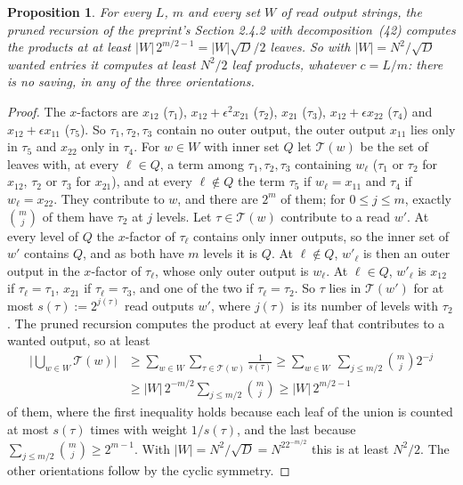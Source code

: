 \documentclass[11pt]{article}
\newtheorem{proposition}[theorem]{Proposition}
\theoremstyle{definition}
\theoremstyle{remark}
\begin{document}
\begin{proposition}\label{a:prop:vrana}
For every $L$, $m$ and every set $W$ of read output strings, the pruned recursion of the preprint's Section 2.4.2 with decomposition~(42) computes the products at at least $|W|\,2^{m/2-1}=|W|\sqrt D/2$ leaves. So with $|W|=N^2/\sqrt D$ wanted entries it computes at least $N^2/2$ leaf products, whatever $c=L/m$: there is no saving, in any of the three orientations.
\end{proposition}

\begin{proof}
The $x$-factors are $x_{12}$ ($\tau_1$), $x_{12}+\epsilon^2x_{21}$ ($\tau_2$), $x_{21}$ ($\tau_3$), $x_{12}+\epsilon x_{22}$ ($\tau_4$) and $x_{12}+\epsilon x_{11}$ ($\tau_5$). So $\tau_1,\tau_2,\tau_3$ contain no outer output, the outer output $x_{11}$ lies only in $\tau_5$ and $x_{22}$ only in $\tau_4$. For $w\in W$ with inner set $Q$ let $\mathcal T(w)$ be the set of leaves with, at every $\ell\in Q$, a term among $\tau_1,\tau_2,\tau_3$ containing $w_\ell$ ($\tau_1$ or $\tau_2$ for $x_{12}$, $\tau_2$ or $\tau_3$ for $x_{21}$), and at every $\ell\notin Q$ the term $\tau_5$ if $w_\ell=x_{11}$ and $\tau_4$ if $w_\ell=x_{22}$. They contribute to $w$, and there are $2^m$ of them; for $0\le j\le m$, exactly $\binom mj$ of them have $\tau_2$ at $j$ levels. Let $\tau\in\mathcal T(w)$ contribute to a read $w'$. At every level of $Q$ the $x$-factor of $\tau_\ell$ contains only inner outputs, so the inner set of $w'$ contains $Q$, and as both have $m$ levels it is $Q$. At $\ell\notin Q$, $w'_\ell$ is then an outer output in the $x$-factor of $\tau_\ell$, whose only outer output is $w_\ell$. At $\ell\in Q$, $w'_\ell$ is $x_{12}$ if $\tau_\ell=\tau_1$, $x_{21}$ if $\tau_\ell=\tau_3$, and one of the two if $\tau_\ell=\tau_2$. So $\tau$ lies in $\mathcal T(w')$ for at most $s(\tau):=2^{j(\tau)}$ read outputs $w'$, where $j(\tau)$ is its number of levels with $\tau_2$. The pruned recursion computes the product at every leaf that contributes to a wanted output, so at least
\begin{align*}
\Big|\bigcup_{w\in W}\mathcal T(w)\Big|&\ge\sum_{w\in W}\sum_{\tau\in\mathcal T(w)}\frac1{s(\tau)}\ge\sum_{w\in W}\ \sum_{j\le m/2}\binom mj2^{-j}\\
&\ge|W|\,2^{-m/2}\sum_{j\le m/2}\binom mj\ge|W|\,2^{m/2-1}
\end{align*}
of them, where the first inequality holds because each leaf of the union is counted at most $s(\tau)$ times with weight $1/s(\tau)$, and the last because $\sum_{j\le m/2}\binom mj\ge2^{m-1}$. With $|W|=N^2/\sqrt D=N^22^{-m/2}$ this is at least $N^2/2$. The other orientations follow by the cyclic symmetry.
\end{proof}
\end{document}
